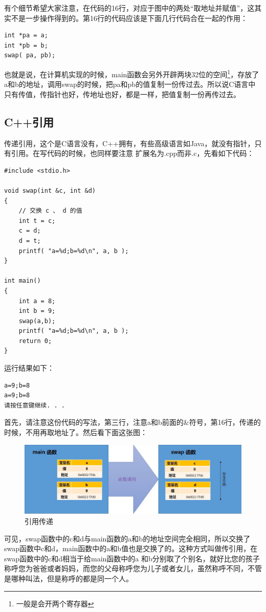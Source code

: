 \documentclass[11pt,twoside,a4paper,titlepage]{article}	%
\begin{document}
有个细节希望大家注意，在代码的16行，对应于图中的两处“取地址并赋值”，这其实不是一步操作得到的。第16行的代码应该是下面几行代码合在一起的作用：
\begin{lstlisting}
int *pa = a;
int *pb = b;
swap( pa, pb);
\end{lstlisting}

也就是说，在计算机实现的时候，main函数会另外开辟两块32位的空间\footnote{一般是会开两个寄存器}，存放了a和b的地址，调用swap的时候，把pa和pb的值复制一份传过去。所以说C语言中只有传值，传指针也好，传地址也好，都是一样，把值复制一份再传过去。

\subsection{C++引用}
传递引用，这个是C语言没有，C++拥有，有些高级语言如Java，就没有指针，只有引用。在写代码的时候，也同样要注意{\color{red} 扩展名为.cpp而非.c}，先看如下代码：
\begin{lstlisting}
#include <stdio.h>

void swap(int &c, int &d)
{
	// 交换 c 、 d 的值
	int t = c;
	c = d;
	d = t;
	printf( "a=%d;b=%d\n", a, b );
}

int main()
{
	int a = 8;
	int b = 9;
	swap(a,b);
	printf( "a=%d;b=%d\n", a, b );
	return 0;
}
\end{lstlisting}

运行结果如下：
\begin{lstlisting}
a=9;b=8
a=9;b=8
请按任意键继续. . .
\end{lstlisting}

首先，请注意这份代码的写法，第三行，注意a和b前面的\&符号，第16行，传递的时候，不用再取地址了。然后看下面这张图：

\begin{figure}[bpht]
\centering
\includegraphics[scale=.5]{../src/swap_04.jpg}
\caption{引用传递}
\label{fig:swap_04}
\end{figure}

可见，swap函数中的c和d与main函数的a和b的地址空间完全相同，所以交换了swap函数中c和d，main函数中的a和b值也是交换了的。这种方式叫做传引用，在swap函数中的c和d相当于给main函数中的a 和b分别取了个别名，就好比您的孩子称呼您为爸爸或者妈妈，而您的父母称呼您为儿子或者女儿，虽然称呼不同，不管是哪种叫法，但是称呼的都是同一个人。
\end{document}
